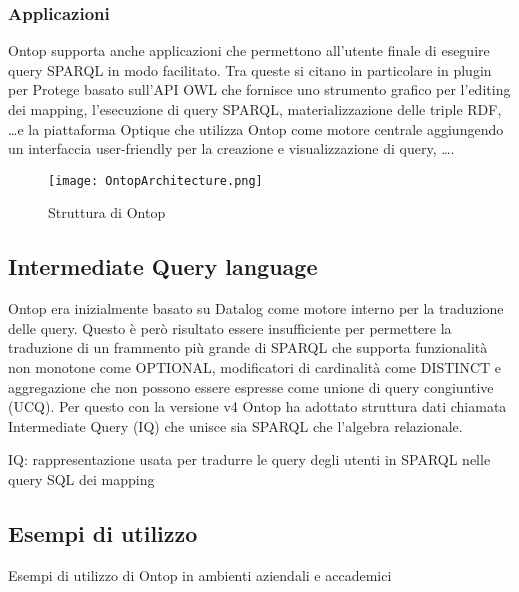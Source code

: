 \subsubsection*{Applicazioni}
Ontop supporta anche applicazioni che permettono all'utente finale di eseguire query SPARQL in modo facilitato. Tra queste si citano in particolare in plugin per Protege basato sull'API OWL 
che fornisce uno strumento grafico per l'editing dei mapping, l'esecuzione di query SPARQL, materializzazione delle triple RDF, \dots e la piattaforma Optique che utilizza Ontop come motore centrale 
aggiungendo un interfaccia user-friendly per la creazione e visualizzazione di query, \dots .

\begin{figure}[h]
    \centering
    \texttt{[image: OntopArchitecture.png]}
    \caption{Struttura di Ontop}
    \label{fig:OntopArchitecture}
\end{figure}

\subsection{Intermediate Query language}
\label{sec:ontop_iq}
Ontop era inizialmente basato su Datalog come motore interno per la traduzione delle query. Questo è però risultato essere insufficiente per permettere la traduzione di un frammento più grande di SPARQL 
che supporta funzionalità non monotone come OPTIONAL, modificatori di cardinalità come DISTINCT e aggregazione che non possono essere espresse come unione di query congiuntive (UCQ). Per questo con la versione
v4 Ontop ha adottato struttura dati chiamata Intermediate Query (IQ) che unisce sia SPARQL che l'algebra relazionale.



IQ: rappresentazione usata per tradurre le query degli utenti in SPARQL nelle query SQL dei mapping

\subsection{Esempi di utilizzo}
Esempi di utilizzo di Ontop in ambienti aziendali e accademici


